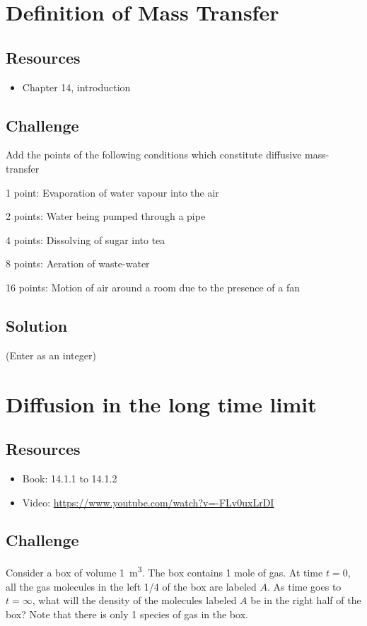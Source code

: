\newpage
\section{Definition of Mass Transfer}

\subsection*{Resources}
\begin{itemize}
    \item Chapter 14, introduction
\end{itemize}

\subsection*{Challenge}
Add the points of the following conditions which constitute diffusive mass-transfer

1 point: Evaporation of water vapour into the air

2 points: Water being pumped through a pipe

4 points: Dissolving of sugar into tea

8 points: Aeration of waste-water

16 points: Motion of air around a room due to the presence of a fan

\subsection*{Solution}
(Enter as an integer)





\newpage
\section{Diffusion in the long time limit}

\subsection*{Resources}
\begin{itemize}
    \item Book: 14.1.1 to 14.1.2
    \item Video: \url{https://www.youtube.com/watch?v=-FLv0uxLrDI}
\end{itemize}

\subsection*{Challenge}
Consider a box of volume \SI{1}{\cubic\meter}. The box contains 1 mole of gas. At time $t=0$, all the gas molecules in the left 1/4 of the box are labeled $A$. As time goes to $t=\infty$, what will the density of the molecules labeled $A$ be in the right half of the box? Note that there is only 1 species of gas in the box.

